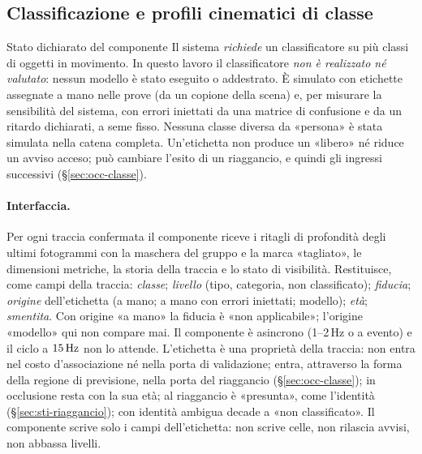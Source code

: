\subsection{Classificazione e profili cinematici di classe}\label{sec:sti-classi}

\begin{riquadro}{Stato dichiarato del componente}
Il sistema \emph{richiede} un classificatore su più classi di oggetti in movimento. In questo lavoro il classificatore \emph{non è realizzato né valutato}: nessun modello è stato eseguito o addestrato. È simulato con etichette assegnate a mano nelle prove (da un copione della scena) e, per misurare la sensibilità del sistema, con errori iniettati da una matrice di confusione e da un ritardo dichiarati, a seme fisso. Nessuna classe diversa da «persona» è stata simulata nella catena completa. Un'etichetta non produce un «libero» né riduce un avviso acceso; può cambiare l'esito di un riaggancio, e quindi gli ingressi successivi (\S\ref{sec:occ-classe}).
\end{riquadro}

\paragraph{Interfaccia.} Per ogni traccia confermata il componente riceve i ritagli di profondità degli ultimi fotogrammi con la maschera del gruppo e la marca «tagliato», le dimensioni metriche, la storia della traccia e lo stato di visibilità. Restituisce, come campi della traccia: \emph{classe}; \emph{livello} (tipo, categoria, non classificato); \emph{fiducia}; \emph{origine} dell'etichetta (a mano; a mano con errori iniettati; modello); \emph{età}; \emph{smentita}. Con origine «a mano» la fiducia è «non applicabile»; l'origine «modello» qui non compare mai. Il componente è asincrono (1--2\,Hz o a evento) e il ciclo a $15\,\mathrm{Hz}$ non lo attende. L'etichetta è una proprietà della traccia: non entra nel costo d'associazione né nella porta di validazione; entra, attraverso la forma della regione di previsione, nella porta del riaggancio (\S\ref{sec:occ-classe}); in occlusione resta con la sua età; al riaggancio è «presunta», come l'identità (\S\ref{sec:sti-riaggancio}); con identità ambigua decade a «non classificato». Il componente scrive solo i campi dell'etichetta: non scrive celle, non rilascia avvisi, non abbassa livelli.

